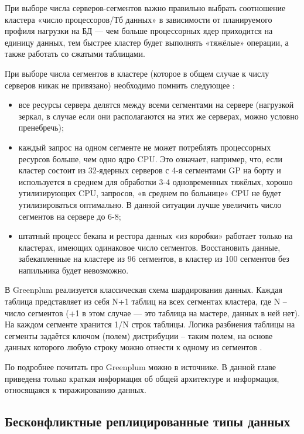 При выборе числа серверов-сегментов важно правильно выбрать соотношение кластера «число процессоров/Тб данных» в
зависимости от планируемого профиля нагрузки на БД — чем больше процессорных ядер приходится на единицу данных, тем
быстрее кластер будет выполнять «тяжёлые» операции, а также работать со сжатыми таблицами.

При выборе числа сегментов в кластере (которое в общем случае к числу серверов никак не привязано) необходимо помнить
следующее \autocite{Greenplum}:
\begin{itemize}
    \item все ресурсы сервера делятся между всеми сегментами на сервере (нагрузкой зеркал, в случае если они располагаются на этих же серверах, можно условно пренебречь);
    \item каждый запрос на одном сегменте не может потреблять процессорных ресурсов больше, чем одно ядро CPU. Это означает, например, что, если кластер состоит из 32-ядерных серверов с 4-я сегментами GP на борту и используется в среднем для обработки 3-4 одновременных тяжёлых, хорошо утилизирующих CPU, запросов, «в среднем по больнице» CPU не будет утилизироваться оптимально. В данной ситуации лучше увеличить число сегментов на сервере до 6-8;
    \item штатный процесс бекапа и рестора данных «из коробки» работает только на кластерах, имеющих одинаковое число сегментов. Восстановить данные, забекапленные на кластере из 96 сегментов, в кластер из 100 сегментов без напильника будет невозможно.
\end{itemize}

В Greenplum реализуется классическая схема шардирования данных. Каждая таблица представляет из себя N+1 таблиц на всех
сегментах кластера, где N – число сегментов (+1 в этом случае — это таблица на мастере, данных в ней нет). На каждом
сегменте хранится 1/N строк таблицы. Логика разбиения таблицы на сегменты задаётся ключом (полем) дистрибуции – таким
полем, на основе данных которого любую строку можно отнести к одному из сегментов \autocite{Greenplum}.

По подробнее почитать про Greenplum можно в источнике. В данной главе приведена только краткая информация об общей
архитектуре и информация, относящаяся к тиражированию данных. \autocite{Greenplum}

\subsection{Бесконфликтные реплицированные типы данных}
